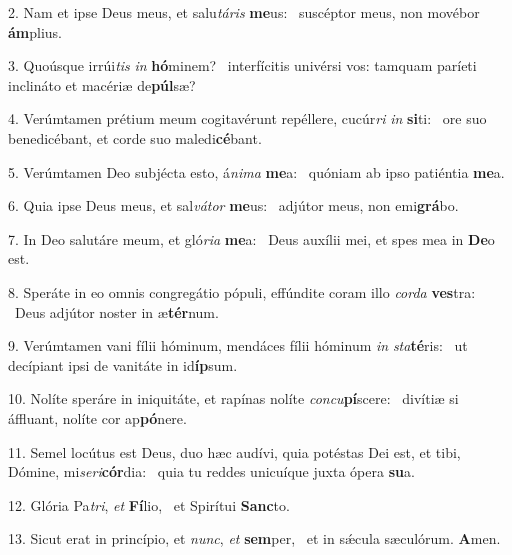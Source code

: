 2. Nam et ipse Deus meus, et salu\textit{tá}\textit{ris} \textbf{me}us: \ast\  suscéptor meus, non movébor \textbf{ám}plius.\

3. Quoúsque irrúi\textit{tis} \textit{in} \textbf{hó}minem? \ast\  interfícitis univérsi vos: tamquam paríeti inclináto et macériæ de\textbf{púl}sæ?\

4. Verúmtamen prétium meum cogitavérunt repéllere, cucúr\textit{ri} \textit{in} \textbf{si}ti: \ast\  ore suo benedicébant, et corde suo maledi\textbf{cé}bant.\

5. Verúmtamen Deo subjécta esto, á\textit{ni}\textit{ma} \textbf{me}a: \ast\  quóniam ab ipso patiéntia \textbf{me}a.\

6. Quia ipse Deus meus, et sal\textit{vá}\textit{tor} \textbf{me}us: \ast\  adjútor meus, non emi\textbf{grá}bo.\

7. In Deo salutáre meum, et gló\textit{ri}\textit{a} \textbf{me}a: \ast\  Deus auxílii mei, et spes mea in \textbf{De}o est.\

8. Speráte in eo omnis congregátio pópuli, effúndite coram illo \textit{cor}\textit{da} \textbf{ves}tra: \ast\  Deus adjútor noster in æ\textbf{tér}num.\

9. Verúmtamen vani fílii hóminum, mendáces fílii hóminum \textit{in} \textit{sta}\textbf{té}ris: \ast\  ut decípiant ipsi de vanitáte in id\textbf{íp}sum.\

10. Nolíte speráre in iniquitáte, et rapínas nolíte \textit{con}\textit{cu}\textbf{pí}scere: \ast\  divítiæ si áffluant, nolíte cor ap\textbf{pó}nere.\

11. Semel locútus est Deus, duo hæc audívi, quia potéstas Dei est, et tibi, Dómine, mi\textit{se}\textit{ri}\textbf{cór}dia: \ast\  quia tu reddes unicuíque juxta ópera \textbf{su}a.\

12. Glória Pa\textit{tri}, \textit{et} \textbf{Fí}lio, \ast\  et Spirítui \textbf{Sanc}to.\

13. Sicut erat in princípio, et \textit{nunc}, \textit{et} \textbf{sem}per, \ast\  et in sǽcula sæculórum. \textbf{A}men.\

